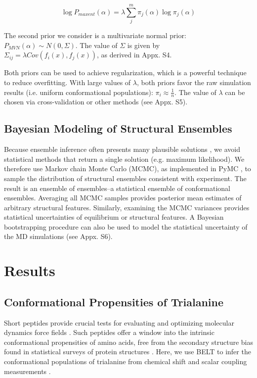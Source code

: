 \documentclass[journal=jacsat,manuscript=article]{achemso}
\begin{document}
$$\log P_{maxent}(\alpha) = \lambda \sum_j^m \pi_j(\alpha) \log \pi_j(\alpha)$$

The second prior we consider is a multivariate normal prior: $P_{MVN}(\alpha) \sim N(0, \Sigma)$.  The value of $\Sigma$ is given by $\Sigma_{ij} = \lambda Cov(f_i(x), f_j(x))$, as derived in Appx. S4.

Both priors can be used to achieve regularization, which is a powerful technique to reduce overfitting.  With large values of $\lambda$, both priors favor the raw simulation results (i.e. uniform conformational populations): $\pi_i \approx \frac{1}{n}$.  The value of $\lambda$ can be chosen via cross-validation or other methods (see Appx. S5).  

\subsection{Bayesian Modeling of Structural Ensembles}

Because ensemble inference often presents many plausible solutions \cite{fisher2010, rieping2005}, we avoid statistical methods that return a single solution (e.g. maximum likelihood).  We therefore use Markov chain Monte Carlo (MCMC), as implemented in PyMC \cite{patil2010pymc}, to sample the distribution of structural ensembles consistent with experiment.  The result is an ensemble of ensembles--a statistical ensemble of conformational ensembles.  Averaging all MCMC samples provides posterior mean  estimates of arbitrary structural features.  Similarly, examining the MCMC variances provides statistical uncertainties of equilibrium or structural features.  A Bayesian bootstrapping procedure \cite{rubin1981} can also be used to model the statistical uncertainty of the MD simulations (see Appx. S6).

\section{Results}

\subsection{Conformational Propensities of Trialanine}

Short peptides provide crucial tests for evaluating and optimizing molecular dynamics force fields \cite{Graf2007,beauchamp2012protein, Nerenberg2011, Best2008, Grdadolnik2011}.  Such peptides offer a window into the intrinsic conformational propensities of amino acids, free from the secondary structure bias found in statistical surveys of protein structures \cite{Jha2005}.  Here, we use BELT to infer the conformational populations of trialanine from chemical shift and scalar coupling measurements \cite{Graf2007}.  
\end{document}
